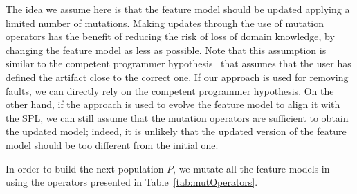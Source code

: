 \begin{tikzborder}{\cite{Gargantini16:validation}}
\begin{tikzborder}{\cite{gargantini_combinatorial_2017}}
\begin{tikzborder}{\cite{garn2019}}
\begin{tikzborder}{\cite{arcaini2019achieving}}
	The idea we assume here is that the feature model should be updated applying a limited number of mutations. Making updates through the use of mutation operators has the benefit of reducing the risk of loss of domain knowledge, by changing the feature model as less as possible. Note that this assumption is similar to the competent programmer hypothesis~\cite{surveyMutationTesting} that assumes that the user has defined the artifact close to the correct one. If our approach is used for removing faults, we can directly rely on the competent programmer hypothesis. On the other hand, if the approach is used to evolve the feature model to align it with the SPL, we can still assume that the mutation operators are sufficient to obtain the updated model; indeed, it is unlikely that the updated version of the feature model should be too different from the initial one.
	
	In order to build the next population $P$, we mutate all the feature models in \PAR using the operators presented in Table~\ref{tab:mutOperators}.\be
	

\end{tikzborder}
\end{tikzborder}
\end{tikzborder}
\end{tikzborder}
